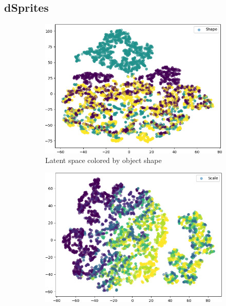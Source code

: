 \subsection{dSprites}\label{subsection:appendix_dsprites_latent_space}
\begin{figure}[H]
    \centering
    \begin{subfigure}{.19\textwidth}
        \includegraphics[width=\textwidth]{images/latent_spaces/dsprites/vae_gan/embeddings_mu_0.png}
        \caption{Latent space colored by object shape}
    \end{subfigure}
    \hfill
    \begin{subfigure}{.19\textwidth}
        \includegraphics[width=\textwidth]{images/latent_spaces/dsprites/vae_gan/embeddings_mu_1.png}

\end{subfigure}
\end{figure}
